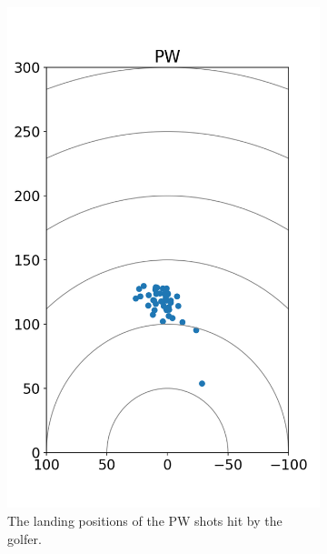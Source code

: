 \documentclass{kththesis}
\begin{document}
\begin{figure}
    \centering
    \begin{subfigure}{0.4\textwidth}
    \centering
    \includegraphics[height=0.4\textheight]{Shots/PW_shots.png} 
    \caption{The landing positions of the PW shots hit by the golfer.}
    \label{fig:PW_shots}
    \end{subfigure}
    \begin{subfigure}{0.4\textwidth}
    \centering

\end{subfigure}
\end{figure}
\end{document}
